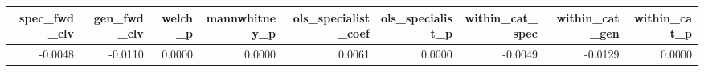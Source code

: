 \begin{tabular}{rrrrrrrrr}
\toprule
spec\_fwd\_clv & gen\_fwd\_clv & welch\_p & mannwhitney\_p & ols\_specialist\_coef & ols\_specialist\_p & within\_cat\_spec & within\_cat\_gen & within\_cat\_p \\
\midrule
-0.0048 & -0.0110 & 0.0000 & 0.0000 & 0.0061 & 0.0000 & -0.0049 & -0.0129 & 0.0000 \\
\bottomrule
\end{tabular}
